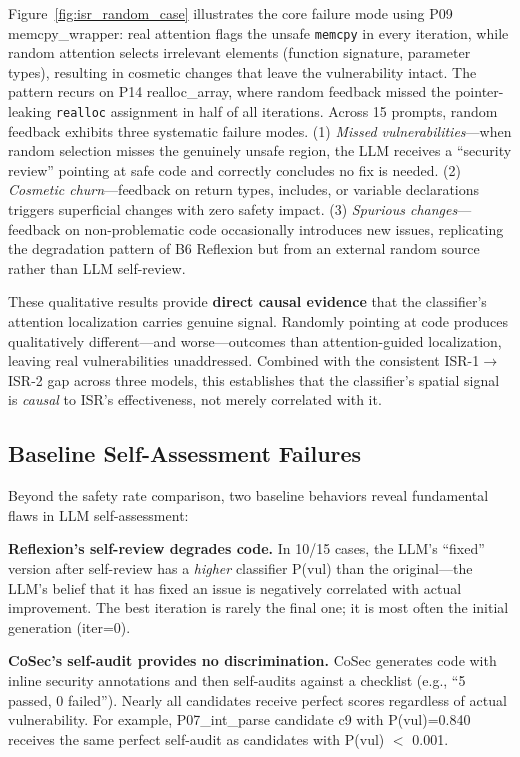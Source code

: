 \documentclass[10pt,conference]{IEEEtran}
\begin{document}
Figure~\ref{fig:isr_random_case} illustrates the core failure mode using P09 memcpy\_wrapper: real attention flags the unsafe \texttt{memcpy} in every iteration, while random attention selects irrelevant elements (function signature, parameter types), resulting in cosmetic changes that leave the vulnerability intact. The pattern recurs on P14 realloc\_array, where random feedback missed the pointer-leaking \texttt{realloc} assignment in half of all iterations. Across 15 prompts, random feedback exhibits three systematic failure modes. (1) \textit{Missed vulnerabilities}---when random selection misses the genuinely unsafe region, the LLM receives a ``security review'' pointing at safe code and correctly concludes no fix is needed. (2) \textit{Cosmetic churn}---feedback on return types, includes, or variable declarations triggers superficial changes with zero safety impact. (3) \textit{Spurious changes}---feedback on non-problematic code occasionally introduces new issues, replicating the degradation pattern of B6 Reflexion but from an external random source rather than LLM self-review.

These qualitative results provide \textbf{direct causal evidence} that the classifier's attention localization carries genuine signal. Randomly pointing at code produces qualitatively different---and worse---outcomes than attention-guided localization, leaving real vulnerabilities unaddressed. Combined with the consistent ISR-1$\rightarrow$ISR-2 gap across three models, this establishes that the classifier's spatial signal is \textit{causal} to ISR's effectiveness, not merely correlated with it.

\subsection{Baseline Self-Assessment Failures}

Beyond the safety rate comparison, two baseline behaviors reveal fundamental flaws in LLM self-assessment:

\textbf{Reflexion's self-review degrades code.} In 10/15 cases, the LLM's ``fixed'' version after self-review has a \textit{higher} classifier P(vul) than the original---the LLM's belief that it has fixed an issue is negatively correlated with actual improvement. The best iteration is rarely the final one; it is most often the initial generation (iter=0).

\textbf{CoSec's self-audit provides no discrimination.} CoSec generates code with inline security annotations and then self-audits against a checklist (e.g., ``5 passed, 0 failed''). Nearly all candidates receive perfect scores regardless of actual vulnerability. For example, P07\_int\_parse candidate c9 with P(vul)=0.840 receives the same perfect self-audit as candidates with P(vul) $<$ 0.001.
\end{document}
